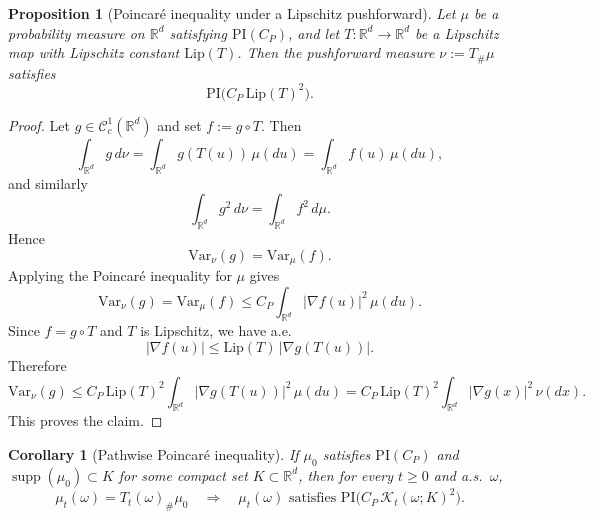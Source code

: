 \documentclass{tsp-short}
\newtheorem{corollary}{Corollary}[section]
\newtheorem{proposition}{Proposition}[section]
\theoremstyle{remark}
\theoremstyle{definition}
\begin{document}
\begin{proposition}[Poincar\'e inequality under a Lipschitz pushforward]\label{prop:poincare-pushforward}
Let $\mu$ be a probability measure on $\mathbb{R}^d$ satisfying $\mathrm{PI}(C_P)$, and let
$T:\mathbb{R}^d\to\mathbb{R}^d$ be a Lipschitz map with Lipschitz constant $\mathrm{Lip}(T)$.
Then the pushforward measure $\nu:=T_{\#}\mu$ satisfies
\begin{equation*}
\mathrm{PI}\big(C_P\,\mathrm{Lip}(T)^2\big).
\end{equation*}
\end{proposition}

\begin{proof}
Let $g\in \mathcal C_c^1(\mathbb{R}^d)$ and set $f:=g\circ T$.
Then
\begin{equation*}
\int_{\mathbb{R}^d} g\,d\nu=\int_{\mathbb{R}^d} g(T(u))\,\mu(du)=\int_{\mathbb{R}^d} f(u)\,\mu(du),
\end{equation*}
and similarly
\begin{equation*}
\int_{\mathbb{R}^d} g^2\,d\nu=\int_{\mathbb{R}^d} f^2\,d\mu.
\end{equation*}
Hence
\begin{equation*}
\mathrm{Var}_\nu(g)=\mathrm{Var}_\mu(f).
\end{equation*}
Applying the Poincar\'e inequality for $\mu$ gives
\begin{equation*}
\mathrm{Var}_\nu(g)
=
\mathrm{Var}_\mu(f)
\le
C_P\int_{\mathbb{R}^d} |\nabla f(u)|^2\,\mu(du).
\end{equation*}
Since $f=g\circ T$ and $T$ is Lipschitz, we have a.e.
\begin{equation*}
|\nabla f(u)|
\le
\mathrm{Lip}(T)\,|\nabla g(T(u))|.
\end{equation*}
Therefore
\begin{equation*}
\mathrm{Var}_\nu(g)
\le
C_P\,\mathrm{Lip}(T)^2
\int_{\mathbb{R}^d} |\nabla g(T(u))|^2\,\mu(du)
=
C_P\,\mathrm{Lip}(T)^2
\int_{\mathbb{R}^d} |\nabla g(x)|^2\,\nu(dx).
\end{equation*}
This proves the claim.
\end{proof}

\begin{corollary}[Pathwise Poincar\'e inequality]\label{cor:poincare-jacobian-constant}
If $\mu_0$ satisfies $\mathrm{PI}(C_P)$ and $\operatorname{supp}(\mu_0)\subset K$ for some compact set $K\subset \mathbb{R}^d$, then for every $t\ge0$ and a.s.\ $\omega$,
\begin{equation*}
\mu_t(\omega)=T_t(\omega)_{\#}\mu_0
\quad\Longrightarrow\quad
\mu_t(\omega)\text{ satisfies }\mathrm{PI}\big(C_P\,\mathcal K_t(\omega;K)^2\big).
\end{equation*}
\end{corollary}
\end{document}
